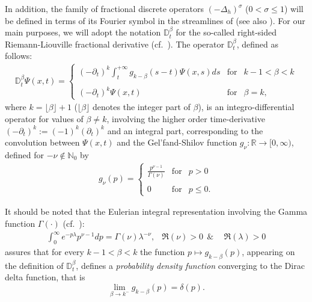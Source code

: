 \documentclass{elsarticle}
\newcommand{\BN}{{\mathbb N}}
\begin{document}
In addition, the family of fractional discrete operators $(-\Delta_h)^{\sigma}$ ($0<\sigma\leq 1$) will be defined in terms of its Fourier symbol in the streamlines of \cite[Section 6.]{LizamaRoncal18} (see also \cite[Section 21.4.3]{F19}). For our main purposes, we will adopt the notation $\mathbb{D}_{t}^\beta$ for the so-called right-sided Riemann-Liouville fractional derivative (cf.~\cite[Chapter 2]{SKM93}).  
The operator $\mathbb{D}_{t}^\beta$, defined as follows:
\begin{eqnarray} 
	\label{RiemannLiouville}
	\mathbb{D}_{t}^\beta\Psi(x,t)=	\left\{\begin{array}{lll} 
		\displaystyle 	(-\partial_t)^k \int_{t}^{+\infty}g_{k-\beta}(s-t)\Psi(x,s)ds & \mbox{for} & k-1<\beta<k
		\\ \ \\
		(-\partial_t)^k \Psi(x,t)& \mbox{for} & \beta=k,
	\end{array}\right.
\end{eqnarray}
where $k=\lfloor \beta \rfloor+1$ ($\lfloor \beta \rfloor$ denotes the integer part of $\beta$), is an integro-differential operator for values of $\beta\neq k$, involving the higher order time-derivative $(-\partial_t)^k:=(-1)^k(\partial_t)^k$ and an integral part, corresponding to the convolution between $\Psi(x,t)$ and
the Gel'fand-Shilov function $g_{\nu}:\mathbb{R}\rightarrow [0,\infty)$, defined for $-\nu \not \in \BN_0$ by
\begin{eqnarray}
	\label{GelfandShilov}g_\nu(p)=\left\{\begin{array}{lll} 
		\displaystyle 	\frac{p^{\nu-1}}{\Gamma(\nu)} & \mbox{for} & p>0
		\\ \ \\
		0 & \mbox{for} &p\leq 0.
	\end{array}\right.
\end{eqnarray}



It should be noted that the Eulerian integral representation involving the Gamma function $\Gamma(\cdot)$ (cf.~\cite[formula 2.3.3. (1), p.322]{PBM86}):
\begin{eqnarray}
	\label{LaplaceId}\int_0^\infty e^{-p\lambda} p^{\nu-1} dp=\Gamma(\nu)\lambda^{-\nu}, & \Re(\nu)>0~~\&&~~  \Re(\lambda)>0
\end{eqnarray}
assures that for every $k-1<\beta <k$ the function $p\mapsto g_{k-\beta}(p)$, appearing on the definition of $\mathbb{D}_{t}^\beta$, defines a {\it probability density function} converging to the Dirac delta function, that is
$$
\lim_{\beta \rightarrow k^-}g_{k-\beta}(p)=\delta(p).
$$
\end{document}
